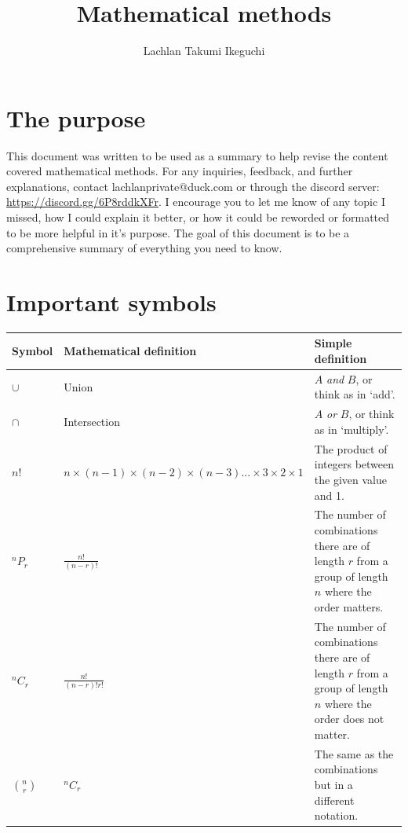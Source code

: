 \documentclass{book}
\title{Mathematical methods}
\author{Lachlan Takumi Ikeguchi}
\begin{document}
\maketitle
\tableofcontents

\section{The purpose}
This document was written to be used as a summary to help revise the content covered mathematical methods.  For any inquiries, feedback, and further explanations, contact lachlanprivate@duck.com or through the discord server: \url{https://discord.gg/6P8rddkXFr}. I encourage you to let me know of any topic I missed, how I could explain it better, or how it could be reworded or formatted to be more helpful in it's purpose.  The goal of this document is to be a comprehensive summary of everything you need to know.

\section{Important symbols}
\begin{center}
	\begin{tabular}{l|lp{6cm}}
		Symbol         & Mathematical definition                                                  & Simple definition                                                                                              \\ \hline
		$\cup$         & Union                                                                    & $A$ \emph{and} $B$, or think as in `add'.                                                                      \\
		$\cap$         & Intersection                                                             & $A$ \emph{or} $B$, or think as in `multiply'.                                                                  \\
		$n!$           & $n \times (n-1) \times (n-2) \times (n-3)... \times 3 \times 2 \times 1$ & The product of integers between the given value and 1.                                                         \\
		$^nP_r$        & $\frac{n!}{(n-r)!}$                                                      & The number of combinations there are of length $r$ from a group of length $n$ where the order matters.         \\
		$^nC_r$        & $\frac{n!}{(n-r)!r!}$                                                    & The number of combinations there are of length $r$ from a group of length $n$ where the order does not matter. \\
		$\binom{n}{r}$ & $^nC_r$                                                                  & The same as the combinations but in a different notation.
	\end{tabular}
\end{center}
\end{document}
